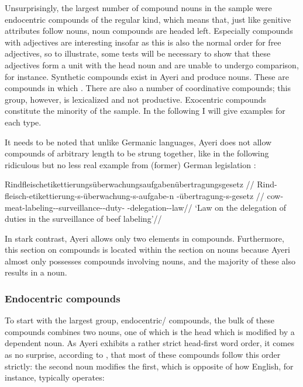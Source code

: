 Unsurprisingly, the largest number of compound nouns in the sample were 
endocentric compounds of the regular kind, which means that, just like genitive 
attributes follow nouns, noun compounds are headed left. Especially compounds 
with adjectives are interesting insofar as this is also the normal order for 
free adjectives, so to illustrate, some tests will be necessary to show that 
these adjectives form a unit with the head noun and are unable to undergo 
comparison, for instance. Synthetic compounds exist in Ayeri and produce nouns. 
These are compounds in which . There are also a number of coordinative compounds; this 
group, however, is lexicalized and not productive. Exocentric compounds 
constitute the minority of the sample. In the following I will give examples for 
each type.

It needs to be noted that unlike Germanic languages, Ayeri does not allow 
compounds of arbitrary length to be strung together, like in the following 
ridiculous but no less real example from (former) German legislation 
\parencite[see, for instance,][]{sz:rindfleisch}:

\ex\begingl{}%
	\gla %
Rindfleisch­etikettierungs­überwachungs­aufgabenübertragungsgesetz 
//
	\glb Rind-fleisch-­etikettierung-s-­überwachung-s­-aufgabe-n%
		-übertragung-s-gesetz //
	\glc cow-meat-labeling-\Lnk{}-surveillance-\Lnk{}-duty-\Lnk{}%
		-delegation-\Lnk{}-law//
	\glft `Law on the delegation of duties in the surveillance of beef 
		labeling'//
\endgl\xe

In stark contrast, Ayeri allows only two elements in compounds. Furthermore, 
this section on compounds is located within the section on nouns because Ayeri 
almost only possesses compounds involving nouns, and the majority of these also 
results in a noun.

\subsubsection{Endocentric compounds}

To start with the largest group, endocentric/ compounds, the bulk 
of these compounds combines two nouns, one of which is the head which is 
modified by a dependent noun. As Ayeri exhibits a rather strict head-first word 
order, it comes as no surprise, according to \citet{gaeta2008}, that most of 
these compounds follow this order strictly: the second noun modifies the first, 
which is opposite of how English, for instance, typically 
operates:

